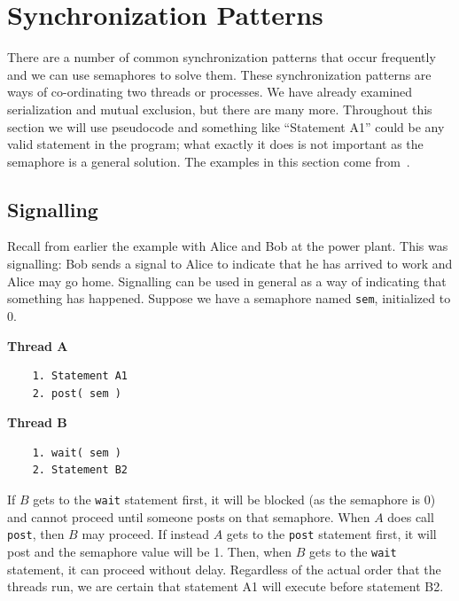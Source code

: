 




\section*{Synchronization Patterns}

There are a number of common synchronization patterns that occur frequently and we can use semaphores to solve them. These synchronization patterns are ways of co-ordinating two threads or processes. We have already examined serialization and mutual exclusion, but there are many more. Throughout this section we will use pseudocode and something like ``Statement A1'' could be any valid statement in the program; what exactly it does is not important as the semaphore is a general solution. The examples in this section come from~\cite{lbs}.

\subsection*{Signalling}
Recall from earlier the example with Alice and Bob at the power plant. This was signalling: Bob sends a signal to Alice to indicate that he has arrived to work and Alice may go home. Signalling can be used in general as a way of indicating that something has happened. Suppose we have a semaphore named \texttt{sem}, initialized to 0.

\begin{multicols}{2}
	\textbf{Thread A}\vspace{-2em}
	\begin{verbatim}
	1. Statement A1
	2. post( sem )
  \end{verbatim}
	\columnbreak
	\textbf{Thread B}\vspace{-2em}
	\begin{verbatim}
	1. wait( sem )
	2. Statement B2
  \end{verbatim}
\end{multicols}
\vspace{-2em}

If $B$ gets to the \texttt{wait} statement first, it will be blocked (as the semaphore is 0) and cannot proceed until someone posts on that semaphore. When $A$ does call \texttt{post}, then $B$ may proceed. If instead $A$ gets to the \texttt{post} statement first, it will post and the semaphore value will be 1. Then, when $B$ gets to the \texttt{wait} statement, it can proceed without delay. Regardless of the actual order that the threads run, we are certain that statement A1 will execute before statement B2.

